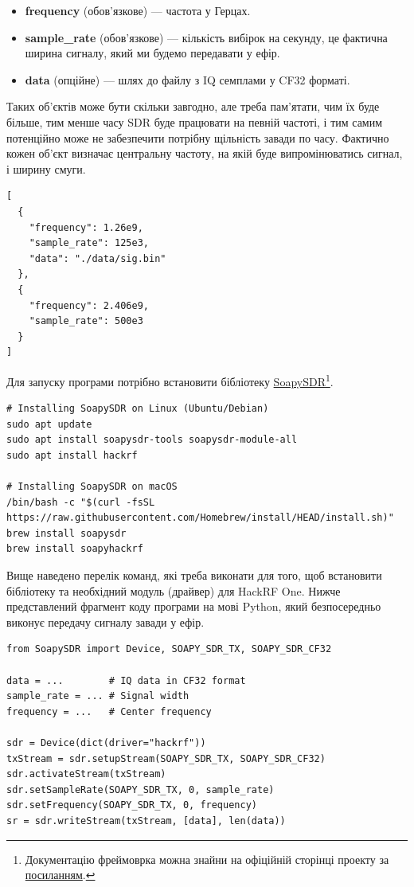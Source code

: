 \documentclass{article}
\begin{document}
\begin{itemize}[noitemsep, topsep=8pt]
\item \textbf{frequency} (обов'язкове) — частота у Герцах.
\item \textbf{sample\_rate} (обов'язкове) — кількість вибірок на секунду, це фактична ширина сигналу, який ми будемо передавати у ефір.
\item \textbf{data} (опційне) — шлях до файлу з IQ семплами у CF32 форматі.
\end{itemize}

Таких об'єктів може бути скільки завгодно, але треба пам'ятати, чим їх буде більше, тим менше часу SDR буде працювати на певній частоті, і тим самим потенційно може не забезпечити потрібну щільність завади по часу. Фактично кожен об'єкт визначає центральну частоту, на якій буде випромінюватись сигнал, і ширину смуги.

\begin{verbatim}
[
  {
    "frequency": 1.26e9,
    "sample_rate": 125e3,
    "data": "./data/sig.bin"
  },
  {
    "frequency": 2.406e9,
    "sample_rate": 500e3
  }
]
\end{verbatim}

Для запуску програми потрібно встановити бібліотеку \href{https://github.com/pothosware/SoapySDR}{SoapySDR}\footnote{Документацію фреймоврка можна знайни на офіційній сторінці проекту за \href{https://github.com/pothosware/SoapySDR/wiki}{посиланням}.}. 

\begin{lstlisting}
# Installing SoapySDR on Linux (Ubuntu/Debian)
sudo apt update
sudo apt install soapysdr-tools soapysdr-module-all
sudo apt install hackrf

# Installing SoapySDR on macOS
/bin/bash -c "$(curl -fsSL https://raw.githubusercontent.com/Homebrew/install/HEAD/install.sh)"
brew install soapysdr
brew install soapyhackrf 
\end{lstlisting}

Вище наведено перелік команд, які треба виконати для того, щоб встановити бібліотеку та необхідний модуль (драйвер) для HackRF One. Нижче представлений фрагмент коду програми на мові Python, який безпосередньо виконує передачу сигналу завади у ефір.

\begin{lstlisting}
from SoapySDR import Device, SOAPY_SDR_TX, SOAPY_SDR_CF32

data = ...        # IQ data in CF32 format
sample_rate = ... # Signal width 
frequency = ...   # Center frequency

sdr = Device(dict(driver="hackrf"))
txStream = sdr.setupStream(SOAPY_SDR_TX, SOAPY_SDR_CF32)
sdr.activateStream(txStream)
sdr.setSampleRate(SOAPY_SDR_TX, 0, sample_rate)
sdr.setFrequency(SOAPY_SDR_TX, 0, frequency)
sr = sdr.writeStream(txStream, [data], len(data))
\end{lstlisting}
\end{document}
